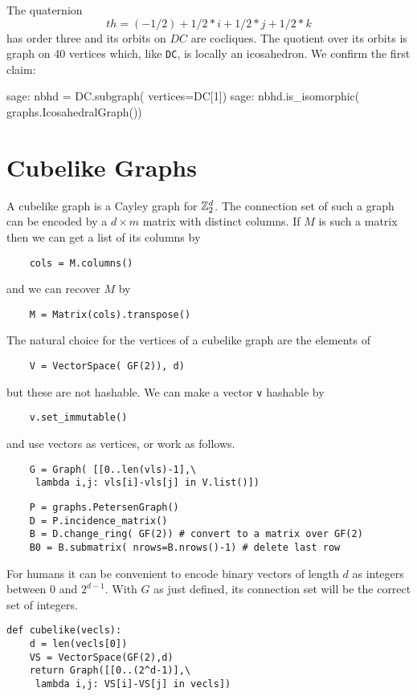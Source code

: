 The quaternion
\[
    th = (-1/2) + 1/2*i + 1/2*j + 1/2*k
\]
has order three and its orbits on $DC$ are cocliques. The quotient
over its orbits is graph on 40 vertices which, like \verb|DC|, is locally
an icosahedron. We confirm the first claim:

\begin{sageexample}
sage: nbhd = DC.subgraph( vertices=DC[1])
sage: nbhd.is_isomorphic( graphs.IcosahedralGraph())
\end{sageexample}


\section{Cubelike Graphs}

A cubelike graph is a Cayley graph for ${\mathbb Z}_2^d$. The connection
set of such a graph can be encoded by a $d\times m$ matrix with distinct
columns. If $M$ is such a matrix then we can get a list of its columns by
\begin{verbatim}
    cols = M.columns()
\end{verbatim}
and we can recover $M$ by
\begin{verbatim}
    M = Matrix(cols).transpose()
\end{verbatim}
The natural choice for the vertices of a cubelike graph are the elements of
\begin{verbatim}
    V = VectorSpace( GF(2)), d)
\end{verbatim}
but these are not hashable. We can make a vector \verb|v| hashable by
\begin{verbatim}
    v.set_immutable()
\end{verbatim}
and use vectors as vertices, or work as follows.
\begin{verbatim}
    G = Graph( [[0..len(vls)-1],\
     lambda i,j: vls[i]-vls[j] in V.list()])
\end{verbatim}

\begin{verbatim}
    P = graphs.PetersenGraph()
    D = P.incidence_matrix()
    B = D.change_ring( GF(2)) # convert to a matrix over GF(2)
    B0 = B.submatrix( nrows=B.nrows()-1) # delete last row
\end{verbatim}

For humans it can be convenient to encode binary vectors of length $d$ as 
integers between 0 and $2^{d-1}$. With $G$ as just defined, its connection
set will be the correct set of integers.

\begin{verbatim}
def cubelike(vecls):
    d = len(vecls[0])
    VS = VectorSpace(GF(2),d)
    return Graph([[0..(2^d-1)],\
     lambda i,j: VS[i]-VS[j] in vecls])
\end{verbatim}